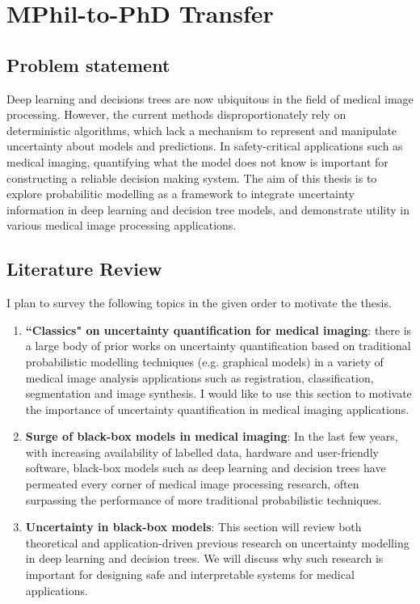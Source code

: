 \chapter*{MPhil-to-PhD Transfer}
\thispagestyle{empty}

\section*{Problem statement}
Deep learning and decisions trees are now ubiquitous in the field of medical image processing. However, the current methods disproportionately rely on deterministic algorithms, which lack a mechanism to represent and manipulate uncertainty about models and predictions. In safety-critical applications such as medical imaging, quantifying what the model does not know is important for constructing a reliable decision making system. The aim of this thesis is to explore probabilitic modelling as a framework to integrate uncertainty information in deep learning and decision tree models, and demonstrate utility in various medical image processing applications. 


\section*{Literature Review} 

I plan to survey the following topics in the given order to motivate the thesis. 

\begin{enumerate}
	\item \textbf{``Classics" on uncertainty quantification for medical imaging}: there is a large body of prior works on uncertainty quantification based on traditional probabilistic modelling techniques (e.g. graphical models) in a variety of medical image analysis applications such as registration, classification, segmentation and image synthesis. I would like to use this section to motivate the importance of uncertainty quantification in medical imaging applications. 

	\item \textbf{Surge of black-box models in medical imaging}: In the last few years, with increasing availability of labelled data, hardware and user-friendly software, black-box models such as deep learning and decision trees have permeated every corner of medical image processing research, often surpassing the performance of more traditional probabilistic techniques. 
	
	\item \textbf{Uncertainty in black-box models}: This section will review both theoretical and application-driven previous research on uncertainty modelling in deep learning and decision trees. We will discuss why such research is important for designing safe and interpretable systems for medical applications. 
\end{enumerate}


